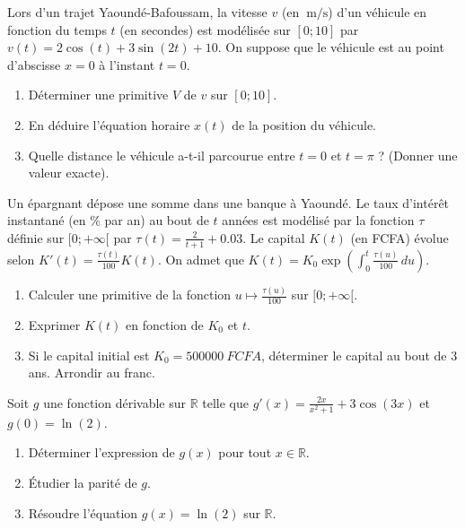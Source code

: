 \documentclass[11pt]{article}
\begin{document}
\begin{exercice}
Lors d'un trajet Yaoundé-Bafoussam, la vitesse $v$ (en $\SI{}{\meter\per\second}$) d'un véhicule en fonction du temps $t$ (en secondes) est modélisée sur $[0; 10]$ par $v(t) = 2\cos(t) + 3\sin(2t) + 10$. On suppose que le véhicule est au point d'abscisse $x=0$ à l'instant $t=0$.
\begin{enumerate}
    \item Déterminer une primitive $V$ de $v$ sur $[0; 10]$.
    \item En déduire l'équation horaire $x(t)$ de la position du véhicule.
    \item Quelle distance le véhicule a-t-il parcourue entre $t=0$ et $t=\pi$ ? (Donner une valeur exacte).
\end{enumerate}
\end{exercice}

\begin{exercice}
Un épargnant dépose une somme dans une banque à Yaoundé. Le taux d'intérêt instantané (en $\%$ par an) au bout de $t$ années est modélisé par la fonction $\tau$ définie sur $[0; +\infty[$ par $\tau(t) = \frac{2}{t+1} + 0.03$. Le capital $K(t)$ (en FCFA) évolue selon $K'(t) = \frac{\tau(t)}{100} K(t)$. On admet que $K(t) = K_0 \exp\left(\int_0^t \frac{\tau(u)}{100}\,du\right)$.
\begin{enumerate}
    \item Calculer une primitive de la fonction $u \mapsto \frac{\tau(u)}{100}$ sur $[0; +\infty[$.
    \item Exprimer $K(t)$ en fonction de $K_0$ et $t$.
    \item Si le capital initial est $K_0 = \SI{500000}{FCFA}$, déterminer le capital au bout de $3$ ans. Arrondir au franc.
\end{enumerate}
\end{exercice}

\begin{exercice}
Soit $g$ une fonction dérivable sur $\mathbb{R}$ telle que $g'(x) = \frac{2x}{x^2+1} + 3\cos(3x)$ et $g(0) = \ln(2)$.
\begin{enumerate}
    \item Déterminer l'expression de $g(x)$ pour tout $x \in \mathbb{R}$.
    \item Étudier la parité de $g$.
    \item Résoudre l'équation $g(x) = \ln(2)$ sur $\mathbb{R}$.
\end{enumerate}
\end{exercice}
\end{document}

